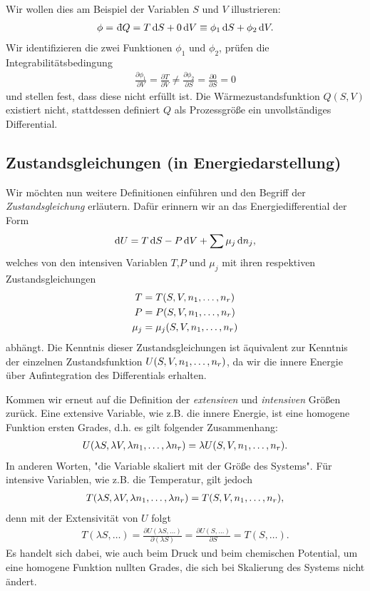 Wir wollen dies am Beispiel der Variablen $S$ und $V$ illustrieren:
\begin{align*}
    \phi = \udiff Q = T\diff S+0 \diff V\equiv \phi_1\diff S+\phi_2 \diff V.
\end{align*}
Wir identifizieren die zwei Funktionen $\phi_1$ und $\phi_2$, prüfen die Integrabilitätsbedingung
\begin{align*}
    \frac{\partial \phi_1}{\partial V} = \frac{\partial T}{\partial V}\neq \frac{\partial \phi_2}{\partial S}=\frac{\partial0}{\partial S}=0
\end{align*}
und stellen fest, dass diese nicht erfüllt ist. Die Wärmezustandsfunktion $Q(S,V)$ existiert nicht, stattdessen definiert $Q$ als Prozessgröße ein unvollständiges Differential.

\subsection{Zustandsgleichungen (in Energiedarstellung)}
Wir möchten nun weitere Definitionen einführen und den Begriff der \textit{Zustandsgleichung} erläutern. Dafür erinnern wir an das Energiedifferential der Form
\begin{align*}
    \mathop{}\!\mathrm{d} U = T\mathop{}\!\mathrm{d} S -P\mathop{}\!\mathrm{d} V + \sum\mu_j\mathop{}\!\mathrm{d} n_j,
\end{align*}
welches von den intensiven Variablen $T$,$P$ und $\mu_j$ mit ihren respektiven Zustandsgleichungen
\begin{align*}
    T     & =T(S,V,n_1,\ldots,n_r)     \\
    P     & =P(S,V,n_1,\ldots,n_r)     \\
    \mu_j & =\mu_j(S,V,n_1,\ldots,n_r)
\end{align*}
abhängt. Die Kenntnis dieser Zustandsgleichungen ist äquivalent zur Kenntnis der einzelnen Zustandsfunktion $U(S,V,n_1,\ldots,n_r)$, da wir die innere Energie über Aufintegration des Differentials erhalten.

Kommen wir erneut auf die Definition der \emph{extensiven} und \emph{intensiven} Größen zurück. Eine extensive Variable, wie z.B. die innere Energie, ist eine homogene Funktion ersten Grades, d.h. es gilt folgender Zusammenhang:
\begin{align*}
    U(\lambda S,\lambda V,\lambda n_1,\ldots,\lambda n_r) = \lambda U(S,V,n_1,\ldots,n_r).
\end{align*}
In anderen Worten, "die Variable skaliert mit der Größe des Systems".
Für intensive Variablen, wie z.B. die Temperatur, gilt jedoch
\begin{align*}
    T(\lambda S,\lambda V,\lambda n_1,\ldots,\lambda n_r)=T(S,V,n_1,\ldots,n_r),
\end{align*}
denn mit der Extensivität von $U$ folgt
\begin{align*}
    T(\lambda S,\ldots) = \frac{\partial U(\lambda S,\ldots)}{\partial(\lambda S)}=\frac{\partial U(S,\ldots)}{\partial S}=T(S,\ldots).
\end{align*}
Es handelt sich dabei, wie auch beim Druck und beim chemischen Potential, um eine homogene Funktion nullten Grades, die sich bei Skalierung des Systems nicht ändert.

